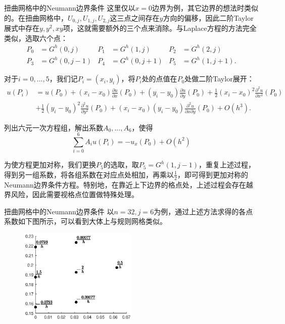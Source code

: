 \documentclass[9pt]{beamer}
\begin{document}
\begin{frame}{扭曲网格中的Neumann边界条件}
\small
这里仅以$x=0$边界为例，其它边界的想法时类似的。在扭曲网格中，$U_{0,j},U_{1,j},U_{2,j}$这三点之间存在$y$方向的偏移，因此二阶Taylor展式中存在$y,y^2,xy$项，这就需要额外的三个点来消除。与Laplace方程的方法完全类似，选取六个点：
\begin{align*}
  P_0&=G^h(0,j) & P_1&=G^h(1,j) & P_2&=G^h(2,j)\\
  P_3&=G^h(0,j-1) & P_4&=G^h(0,j+1) & P_5&=G^h(1,j+1).
\end{align*}

\pause
对于$i=0,...,5$，我们记$P_i=(x_i,y_i)$，将$P_i$处的点值在$P_0$处做二阶Taylor展开：
\begin{align*}
  u(P_i)&=u(P_0)+(x_i-x_0)\frac{\partial u}{\partial x}(P_0)+(y_i-y_0)\frac{\partial u}{\partial y}(P_0)
  +\frac{1}{2}(x_i-x_0)^2\frac{\partial^2 u}{\partial x^2}(P_0) \\
  & +\frac{1}{2}(y_i-y_0)^2\frac{\partial^2 u}{\partial y^2}(P_0)
  +(x_i-x_0)(y_i-y_0)\frac{\partial^2 u}{\partial x \partial y}(P_0)+O(h^3).
\end{align*}

\pause
列出六元一次方程组，解出系数$A_0,...,A_6$，使得
\begin{equation*}
  \sum_{i=0}^6 A_iu(P_i)=-u_x(P_0)+O(h^2)
\end{equation*}

为使方程更加对称，我们更换$P_5$的选取，取$P_5=G^h(1,j-1)$，重复上述过程，得到另一组系数，将各组系数在对应点处相加，再乘以$\frac{1}{2}$，即可得到更加对称的Neumann边界条件方程。特别地，在靠近上下边界的格点处，上述过程会存在越界风险，因此需要视格点位置做特殊处理。
\end{frame}

\begin{frame}{扭曲网格中的Neumann边界条件}
以$n=32,j=6$为例，通过上述方法求得的各点系数如下图所示，可以看到大体上与规则网格类似。

\begin{figure}[H]
  \centering
  \includegraphics[width=0.5\textwidth]{../report/figure/3-3.eps}
\end{figure}
\end{frame}
\end{document}
